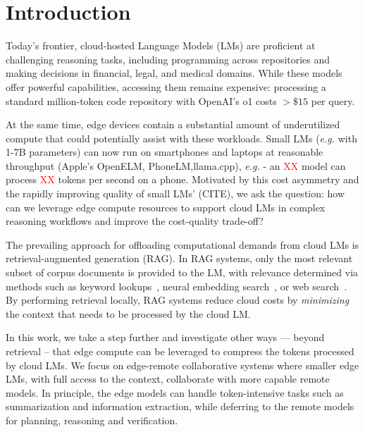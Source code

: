 \section{Introduction}
\label{sec:intro}

Today's frontier, cloud-hosted Language Models (LMs) are proficient at challenging reasoning tasks, including programming across repositories and making decisions in financial, legal, and medical domains. While these models offer powerful capabilities, accessing them remains expensive: processing a standard million-token code repository with OpenAI's o1 costs $>\$15$ per query. 

At the same time, edge devices contain a substantial amount of underutilized compute that could potentially assist with these workloads. Small LMs (\textit{e.g.} with 1-7B parameters) can now run on smartphones and laptops at reasonable throughput (Apple's OpenELM, PhoneLM,llama.cpp), \textit{e.g.} - an \textcolor{red}{XX} model can process \textcolor{red}{XX} tokens per second on a phone. Motivated by this cost asymmetry and the rapidly improving quality of small LMs' (CITE), we ask the question: how can we leverage edge compute resources to support cloud LMs in complex reasoning workflows and improve the cost-quality trade-off?

The prevailing approach for offloading computational demands from cloud LMs is retrieval-augmented generation (RAG). In RAG systems, only the most relevant subset of corpus documents is provided to the LM, with relevance determined via methods such as keyword lookups~\cite{robertson_relevance_2009}, neural embedding search~\cite{karpukhin2020dense,lewis2020retrieval,lee2019latent}, or web search~\cite{nakano2021webgpt}. By performing retrieval locally, RAG systems reduce cloud costs by \textit{minimizing} the context that needs to be processed by the cloud LM.

In this work, we take a step further and investigate other ways --- beyond retrieval -- that edge compute can be leveraged to compress the tokens processed by cloud LMs.
We focus on edge-remote collaborative systems where smaller edge LMs, with full access to the context, collaborate with more capable remote models. 
In principle, the edge models can handle token-intensive tasks such as summarization and information extraction, while deferring to the remote models for planning, reasoning and verification.

